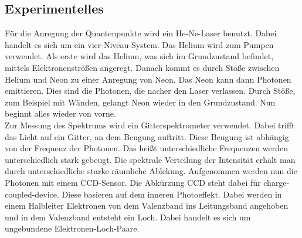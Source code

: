 \subsection{Experimentelles}
Für die Anregung der Quantenpunkte wird ein He-Ne-Laser benutzt. Dabei handelt es sich um ein vier-Niveau-System. 
Das Helium wird zum Pumpen verwendet. 
Als erste wird das Helium, was sich im Grundzustand befindet, mittels Elektronenströßen angeregt. 
Danach kommt es durch Stöße zwischen Helium und Neon zu einer Anregung von Neon. 
Das Neon kann dann Photonen emittieren. 
Dies sind die Photonen, die nacher den Laser verlassen. 
Durch Stöße, zum Beispiel mit Wänden, gelangt Neon wieder in den Grundzustand. 
Nun beginnt alles wieder von vorne. \\
Zur Messung des Spektrums wird ein Gitterspektrometer verwendet. Dabei trifft das Licht auf ein Gitter, an dem Beugung auftritt. Diese Beugung ist abhängig von der Frequenz der Photonen. 
Das heißt unterschiedliche Frequenzen werden unterschiedlich stark gebeugt. 
Die spektrale Verteilung der Intensität erhält man durch unterschiedliche starke räumliche Ablekung.
Aufgenommen werden nun die Photonen mit einem CCD-Sensor. 
Die Abkürzung CCD steht dabei für charge-coupled-device. 
Diese basieren auf dem inneren Photoeffekt. 
Dabei werden in einem Halbleiter Elektronen von dem Valenzband ins Leitungsband angehoben und in dem Valenzband entsteht ein Loch. 
Dabei handelt es sich um ungebundene Elektronen-Loch-Paare. 











